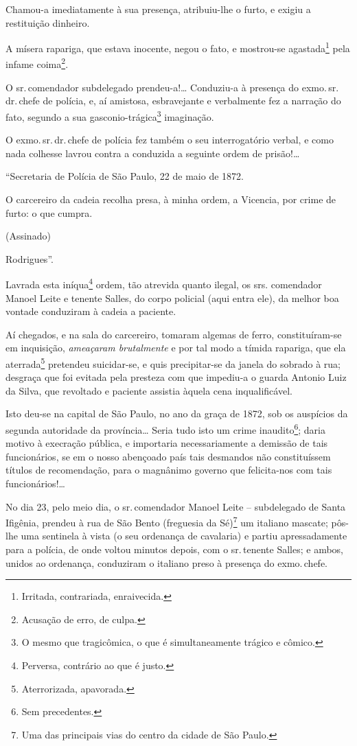Chamou-a imediatamente à sua presença, atribuiu-lhe o furto, e exigiu a
restituição dinheiro.

A mísera rapariga, que estava inocente, negou o fato, e mostrou-se
agastada\footnote{ Irritada, contrariada, enraivecida.} pela infame
coima\footnote{ Acusação de erro, de culpa.}.

O sr.\,comendador subdelegado prendeu-a!\ldots{} Conduziu-a à presença do
exmo.\,sr.\,dr.\,chefe de polícia, e, aí amistosa, esbravejante e
verbalmente fez a narração do fato, segundo a sua
gasconio-trágica\footnote{ O mesmo que tragicômica, o que é
  simultaneamente trágico e cômico.} imaginação.

O exmo.\,sr.\,dr.\,chefe de polícia fez também o seu interrogatório verbal,
e como nada colhesse lavrou contra a conduzida a seguinte ordem de
prisão!\ldots{}

``Secretaria de Polícia de São Paulo, 22 de maio de 1872.

O carcereiro da cadeia recolha presa, à minha ordem, a Vicencia, por
crime de furto: o que cumpra.

(Assinado)

Rodrigues''.

Lavrada esta iníqua\footnote{ Perversa, contrário ao que é justo.}
ordem, tão atrevida quanto ilegal, os srs. comendador Manoel Leite e
tenente Salles, do corpo policial (aqui entra ele), da melhor boa
vontade conduziram à cadeia a paciente.

Aí chegados, e na sala do carcereiro, tomaram algemas de ferro,
constituíram-se em inquisição, \emph{ameaçaram brutalmente} e por tal
modo a tímida rapariga, que ela aterrada\footnote{ Aterrorizada,
  apavorada.} pretendeu suicidar-se, e quis precipitar-se da janela do
sobrado à rua; desgraça que foi evitada pela presteza com que impediu-a
o guarda Antonio Luiz da Silva, que revoltado e paciente assistia àquela
cena inqualificável.

Isto deu-se na capital de São Paulo, no ano da graça de 1872, sob os
auspícios da segunda autoridade da província\ldots{} Seria tudo isto um crime
inaudito\footnote{ Sem precedentes.}; daria motivo à execração pública,
e importaria necessariamente a demissão de tais funcionários, se em o
nosso abençoado país tais desmandos não constituíssem títulos de
recomendação, para o magnânimo governo que felicita-nos com tais
funcionários!\ldots{}

No dia 23, pelo meio dia, o sr.\,comendador Manoel Leite -- subdelegado
de Santa Ifigênia, prendeu à rua de São Bento (freguesia da
Sé)\footnote{ Uma das principais vias do centro da cidade de São Paulo.}
um italiano mascate; pôs-lhe uma sentinela à vista (o seu ordenança de
cavalaria) e partiu apressadamente para a polícia, de onde voltou
minutos depois, com o sr.\,tenente Salles; e ambos, unidos ao ordenança,
conduziram o italiano preso à presença do exmo.\,chefe.

